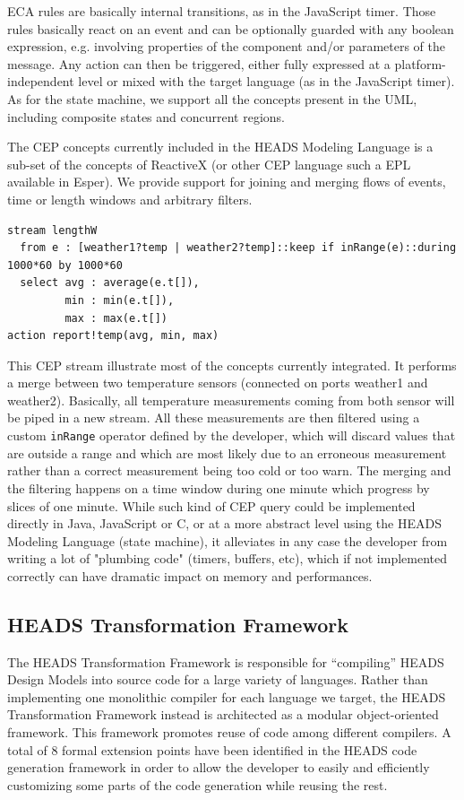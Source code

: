 ECA rules are basically internal transitions, as in the JavaScript timer. Those rules basically react on an event and can be optionally guarded with any boolean expression, e.g. involving properties of the component and/or parameters of the message. Any action can then be triggered, either fully expressed at a platform-independent level or mixed with the target language (as in the JavaScript timer). As for the state machine, we support all the concepts present in the UML, including composite states and concurrent regions.  

The CEP concepts currently included in the HEADS Modeling Language is a sub-set of the concepts of ReactiveX (or other CEP language such a EPL available in Esper). We provide support for joining and merging flows of events, time or length windows and arbitrary filters.  

\begin{lstlisting}
stream lengthW 
  from e : [weather1?temp | weather2?temp]::keep if inRange(e)::during 1000*60 by 1000*60
  select avg : average(e.t[]),  
         min : min(e.t[]),  
         max : max(e.t[])  
action report!temp(avg, min, max)
\end{lstlisting}

This CEP stream illustrate most of the concepts currently integrated. It performs a merge between two temperature sensors (connected on ports weather1 and weather2). Basically, all temperature measurements coming from both sensor will be piped in a new stream. All these measurements are then filtered using a custom \texttt{inRange} operator defined by the developer, which will discard values that are outside a range and which are most likely due to an erroneous measurement rather than a correct measurement being too cold or too warn. The merging and the filtering happens on a time window during one minute which progress by slices of one minute. While such kind of CEP query could be implemented directly in Java, JavaScript or C, or at a more abstract level using the HEADS Modeling Language (state machine), it alleviates in any case the developer from writing a lot of "plumbing code" (timers, buffers, etc), which if not implemented correctly can have dramatic impact on memory and performances.

\subsection{HEADS Transformation Framework}

The HEADS Transformation Framework is responsible for ``compiling''  HEADS Design Models into source code for a large variety of languages. Rather than implementing one monolithic compiler for each language we target, the HEADS Transformation Framework instead is architected as a modular object-oriented framework. This framework promotes reuse of code among different compilers. A total of 8 formal extension points have been identified in the HEADS code generation framework in order to allow the developer to easily and efficiently customizing some parts of the code generation while reusing the rest. 

